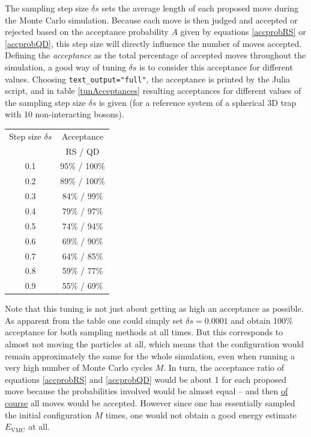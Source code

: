 \documentclass[a4paper,8pt]{article}
\begin{document}
\begin{multicols}{2}
The sampling step size $\delta s$ sets the average length of each proposed move during the Monte Carlo simulation. Because each move is then judged and accepted or rejected based on the acceptance probability $A$ given by equations \eqref{accprobRS} or \eqref{accprobQD}, this step size will directly influence the number of moves accepted. Defining the \textit{acceptance} as the total percentage of accepted moves throughout the simulation, a good way of tuning $\delta s$ is to consider this acceptance for different values. Choosing \texttt{text\_output="full"}, the acceptance is printed by the Julia script, and in table \ref{tunAcceptances} resulting acceptances for different values of the sampling step size $\delta s$ is given (for a reference system of a spherical 3D trap with 10 non-interacting bosons).

\begin{center}\small
{}
\label{tunAcceptances}
\begin{tabular}{cc}
	\hline\hline
	Step size $\delta s$ & Acceptance \\
	 & RS / QD\\
	\hline
    0.1 & 95\% / 100\%\\
    0.2 & 89\% / 100\%\\
    0.3 & 84\% / 99\%\\
    0.4 & 79\% / 97\%\\
    0.5 & 74\% / 94\%\\
    0.6 & 69\% / 90\%\\
    0.7 & 64\% / 85\%\\
    0.8 & 59\% / 77\%\\
    0.9 & 55\% / 69\%\\
    \hline\hline
\end{tabular}
\end{center}

Note that this tuning is not just about getting as high an acceptance as possible. As apparent from the table one could simply set ${\delta s = 0.0001}$ and obtain 100\% acceptance for both sampling methods at all times. But this corresponds to almost not moving the particles at all, which means that the configuration would remain approximately the same for the whole simulation, even when running a very high number of Monte Carlo cycles $M$. In turn, the acceptance ratio of equations \eqref{accprobRS} and \eqref{accprobQD} would be about 1 for each proposed move because the probabilities involved would be almost equal -- and then \underline{of course} all moves would be accepted. However since one has essentially sampled the initial configuration $M$ times, one would not obtain a good energy estimate $E_\text{VMC}$ at all.


\end{multicols}
\end{document}
